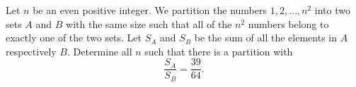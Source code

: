 Let $n$ be an even positive integer.
We partition the numbers $1,2,\ldots,n^2$ into two sets $A$ and $B$ with the same size
such that all of the $n^2$ numbers belong to exactly one of the two sets.
Let $S_A$ and $S_B$ be the sum of all the elements in $A$ respectively $B$.
Determine all $n$ such that there is a partition with
$$\frac{S_A}{S_B} = \frac{39}{64}.$$
